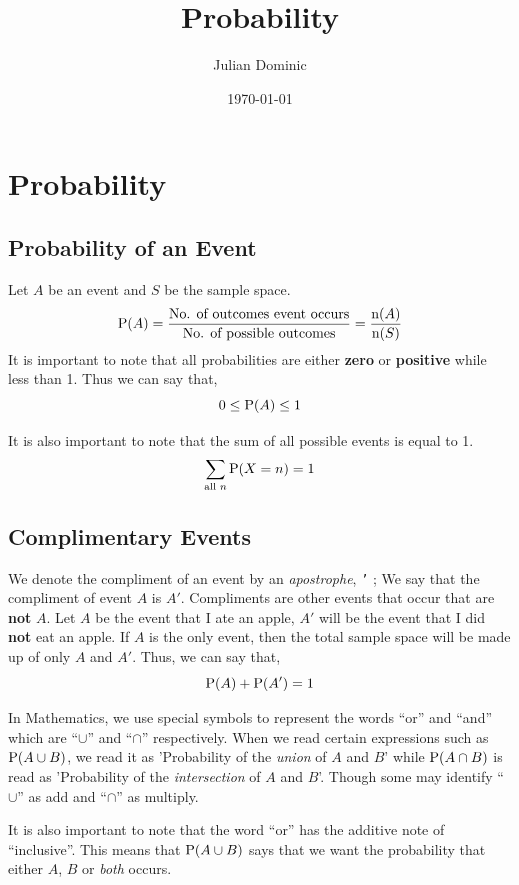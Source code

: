 \documentclass[../setup.tex]{subfiles}
\begin{document}
\title{Probability}
\author{Julian Dominic}
\date{\today}
\maketitle
\clearpage

\tableofcontents
{}
\clearpage

\setcounter{page}{1}

\section{Probability}

\subsection{Probability of an Event}
\begin{theorem}
Let $A$ be an event and $S$ be the sample space.
\[ \textup{P}(A) = \frac{\text{No. of outcomes event occurs}}{\text{No. of possible outcomes}} = \frac{\textup{n}(A)}{\textup{n}(S)} \]
It is important to note that all probabilities are either \textbf{zero} or \textbf{positive} while less than 1. Thus we can say that,
\[ 0 \leq \textup{P}(A) \leq 1 \]
\end{theorem}

\begin{remark} 
It is also important to note that the sum of all possible events is equal to 1. \[ \sum_{\text{all } n} \textup{P}(X=n) = 1 \]
\end{remark}

\subsection{Complimentary Events}
\begin{theorem}
We denote the compliment of an event by an \textit{apostrophe}, \texttt{'} ; We say that the compliment of event $A$ is $A'$. Compliments are other events that occur that are \textbf{not} $A$. Let $A$ be the event that I ate an apple, $A'$ will be the event that I did \textbf{not} eat an apple. If $A$ is the only event, then the total sample space will be made up of only $A$ and $A'$. Thus, we can say that,
\[ \label{compliment} \textup{P}(A) + \textup{P}(A') = 1\]
\end{theorem}

In Mathematics, we use special symbols to represent the words ``or'' and ``and'' which are ``$\cup$'' and ``$\cap$'' respectively. When we read certain expressions such as $\textup{P}(A \cup B)$, we read it as 'Probability of the \textit{union} of $A$ and $B$' while $\textup{P}(A \cap B)$ is read as 'Probability of the \textit{intersection} of $A$ and $B$'. Though some may identify ``$\cup$'' as add and ``$\cap$'' as multiply.
\begin{remark}
It is also important to note that the word ``or'' has the additive note of ``inclusive''. This means that $\textup{P}(A \cup B)$ says that we want the probability that either $A$, $B$ or \textit{both} occurs.
\end{remark}
\end{document}
